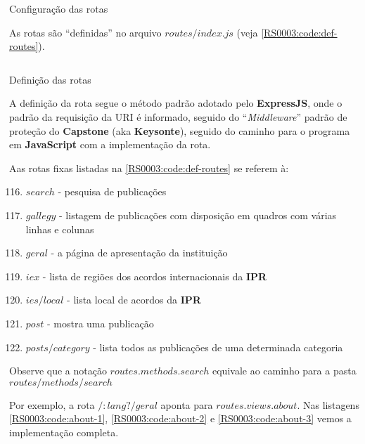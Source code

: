 \begin{code}
    \inputminted[label=default.js,firstline=83,lastline=86]{JavaScript}{../RS0003/anexos/default.js}
    \caption{Configuração das rotas}\label{RS0003:code:conf-routes}
\end{code}

As rotas são ``definidas'' no arquivo $routes / index.js$ (veja \cref{RS0003:code:def-routes}).

\begin{code}
    \inputminted[label=index.js,firstline=105,lastline=115]{JavaScript}{../RS0003/anexos/index.js}
    \caption{Definição das rotas}\label{RS0003:code:def-routes}
\end{code}

A definição da rota segue o método padrão adotado pelo \textbf{ExpressJS}, onde o padrão da requisição da \gls{URI} é informado, seguido do ``\textit{Middleware}'' padrão de proteção do \textbf{Capstone} (aka \textbf{Keysonte}), seguido do caminho para o programa em \textbf{JavaScript} com a implementação da rota.

Aas rotas fixas listadas na \cref{RS0003:code:def-routes} se referem à:

\begin{enumerate}
    \setcounter{enumi}{115}
    \item $search$ - pesquisa de publicações
    \item $gallegy$ - listagem de publicações com disposição em quadros com várias linhas e colunas
    \item $geral$ - a página de apresentação da instituição
    \item $iex$ - lista de regiões dos acordos internacionais da \textbf{IPR}
    \item $ies/local$ - lista local de acordos da \textbf{IPR}
    \item $post$ - mostra uma publicação
    \item $posts/category$ - lista todos as publicações de uma determinada categoria
\end{enumerate}

\begin{displayquote}
    Observe que a notação $routes.methods.search$ equivale ao caminho para a pasta $routes / methods / search$
\end{displayquote}

Por exemplo, a rota $/:lang?/geral$ aponta para $routes.views.about$. Nas listagens \ref{RS0003:code:about-1},  \ref{RS0003:code:about-2} e  \ref{RS0003:code:about-3} vemos a implementação completa.

